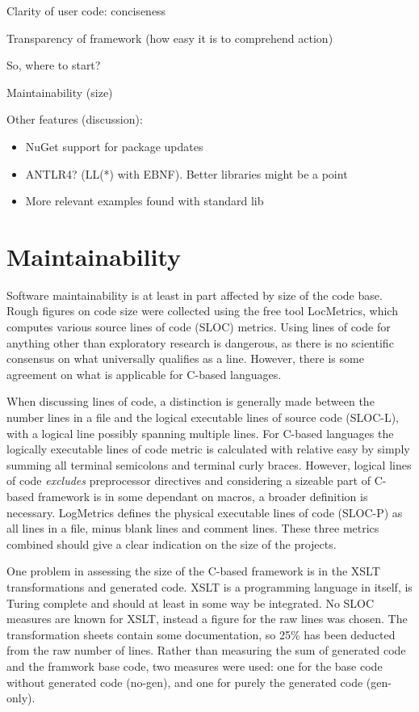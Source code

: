 \documentclass[twoside,openright]{uva-bachelor-thesis}
\begin{document}
			Clarity of user code: conciseness
			
			Transparency of framework (how easy it is to comprehend action)
			
			So, where to start?
			
			
			
			Maintainability (size)
			
			Other features (discussion):
			\begin{itemize}
			\item NuGet support for package updates
			\item ANTLR4? (LL(*) with EBNF). Better libraries might be a point
			\item More relevant examples found with standard lib
			\
			\end{itemize}
		
	
	\section{Maintainability}
		Software maintainability is at least in part affected by size of the code base. Rough figures on code size were collected using the free tool LocMetrics, which computes various source lines of code (SLOC) metrics. Using lines of code for anything other than exploratory research is dangerous, as there is no scientific consensus on what universally qualifies as a line. However, there is some agreement on what is applicable for C-based languages.
		
		When discussing lines of code, a distinction is generally made between the number lines in a file and the logical executable lines of source code (SLOC-L), with a logical line possibly spanning multiple lines. For C-based languages the logically executable lines of code metric is calculated with relative easy by simply summing all terminal semicolons and terminal curly braces\cite{nguyen2007sloc}. However, logical lines of code \emph{excludes} preprocessor directives and considering a sizeable part of C-based framework is in some dependant on macros, a broader definition is necessary. LogMetrics defines the physical executable lines of code (SLOC-P) as all lines in a file, minus blank lines and comment lines. These three metrics combined should give a clear indication on the size of the projects.
		
		One problem in assessing the size of the C-based framework is in the XSLT transformations and generated code. XSLT is a programming language in itself, is Turing complete and should at least in some way be integrated. No SLOC measures are known for XSLT, instead a figure for the raw lines was chosen. The transformation sheets contain some documentation, so 25\% has been deducted from the raw number of lines. Rather than measuring the sum of generated code and the framwork base code, two measures were used: one for the base code without generated code (no-gen), and one for purely the generated code (gen-only).
		
\end{document}
